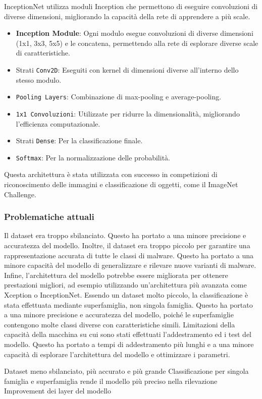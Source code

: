 InceptionNet utilizza moduli Inception che permettono di eseguire convoluzioni di diverse dimensioni, migliorando la capacità della rete di apprendere a più scale.
\begin{itemize}
    \item \textbf{Inception Module}: Ogni modulo esegue convoluzioni di diverse dimensioni (1x1, 3x3, 5x5) e le concatena, permettendo alla rete di esplorare diverse scale di caratteristiche.
    \item Strati \texttt{Conv2D}: Eseguiti con kernel di dimensioni diverse all'interno dello stesso modulo.
    \item \texttt{Pooling Layers}: Combinazione di max-pooling e average-pooling.
    \item \texttt{1x1 Convoluzioni}: Utilizzate per ridurre la dimensionalità, migliorando l'efficienza computazionale.
    \item Strati \texttt{Dense}: Per la classificazione finale.
    \item \texttt{Softmax}: Per la normalizzazione delle probabilità.
\end{itemize}
Questa architettura è stata utilizzata con successo in competizioni di riconoscimento delle immagini e classificazione di oggetti, come il ImageNet Challenge.

\subsubsection{Problematiche attuali}
\label{Problema}
Il dataset era troppo sbilanciato. Questo ha portato a una minore precisione e accuratezza del modello. Inoltre, il dataset era troppo piccolo per garantire una rappresentazione accurata di tutte le classi di malware. Questo ha portato a una minore capacità del modello di generalizzare e rilevare nuove varianti di malware. Infine, l'architettura del modello potrebbe essere migliorata per ottenere prestazioni migliori, ad esempio utilizzando un'architettura più avanzata come Xception o InceptionNet.
Essendo un dataset molto piccolo, la classificazione è stata effettuata mediante superfamiglia, non singola famiglia. Questo ha portato a una minore precisione e accuratezza del modello, poiché le superfamiglie contengono molte classi diverse con caratteristiche simili.
Limitazioni della capacità della macchina su cui sono stati effettuati l'addestramento ed i test del modello. Questo ha portato a tempi di addestramento più lunghi e a una minore capacità di esplorare l'architettura del modello e ottimizzare i parametri.

Dataset meno sbilanciato, più accurato e più grande
Classificazione per singola famiglia e superfamiglia rende il modello più preciso nella rilevazione
Improvement dei layer del modello
